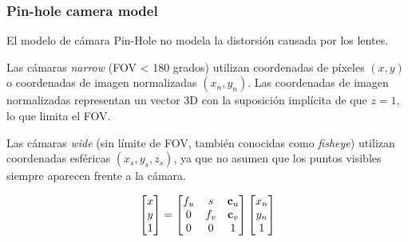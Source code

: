 \begin{frame}
    \frametitle{Pin-hole camera model}
    
    El modelo de cámara Pin-Hole no modela la distorsión causada por los lentes.

    Las cámaras \emph{narrow} (FOV < 180 grados) utilizan coordenadas de píxeles $(x, y)$ o coordenadas de imagen normalizadas $(x_{n}, y_{n})$. 
    Las coordenadas de imagen normalizadas representan un vector 3D con la suposición implícita de que $z = 1$, lo que limita el FOV.

    Las cámaras \emph{wide} (sin límite de FOV, también conocidas como \emph{fisheye}) utilizan coordenadas esféricas $(x_{s}, y_{s}, z_{s})$, ya que no asumen que los puntos visibles siempre aparecen frente a la cámara.

    \begin{equation*}
        \begin{bmatrix}
            x\\
            y\\
            1
        \end{bmatrix} =
        \begin{bmatrix}
            f_{u} & s & \boldsymbol{\mathbf{c}}_{u}\\
            0 & f_{v} & \boldsymbol{\mathbf{c}}_{v}\\
            0 & 0 & 1
        \end{bmatrix}
        \begin{bmatrix}
            x_{n}\\
            y_{n}\\
            1
        \end{bmatrix}
    \end{equation*}
    
\end{frame}


